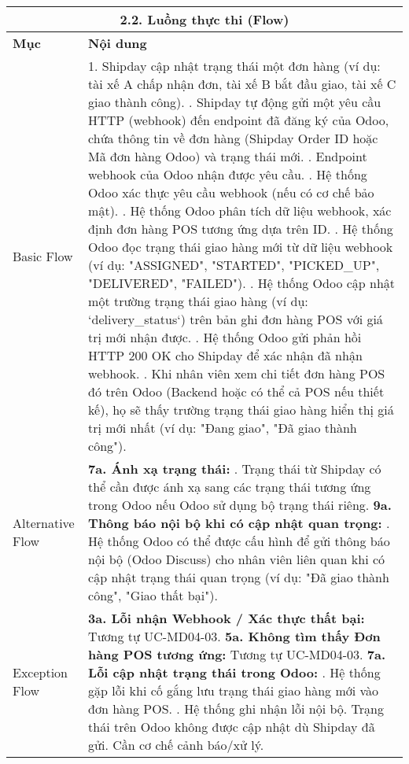 \begin{longtable}{|m{4cm}|p{11cm}|}
\hline
\multicolumn{2}{|c|}{\textbf{2.2. Luồng thực thi (Flow)}} \\
\hline
\textbf{Mục} & \textbf{Nội dung} \\
\hline
Basic Flow & 1. Shipday cập nhật trạng thái một đơn hàng (ví dụ: tài xế A chấp nhận đơn, tài xế B bắt đầu giao, tài xế C giao thành công). \newline 2. Shipday tự động gửi một yêu cầu HTTP (webhook) đến endpoint đã đăng ký của Odoo, chứa thông tin về đơn hàng (Shipday Order ID hoặc Mã đơn hàng Odoo) và trạng thái mới. \newline 3. Endpoint webhook của Odoo nhận được yêu cầu. \newline 4. Hệ thống Odoo xác thực yêu cầu webhook (nếu có cơ chế bảo mật). \newline 5. Hệ thống Odoo phân tích dữ liệu webhook, xác định đơn hàng POS tương ứng dựa trên ID. \newline 6. Hệ thống Odoo đọc trạng thái giao hàng mới từ dữ liệu webhook (ví dụ: "ASSIGNED", "STARTED", "PICKED\_UP", "DELIVERED", "FAILED"). \newline 7. Hệ thống Odoo cập nhật một trường trạng thái giao hàng (ví dụ: `delivery\_status`) trên bản ghi đơn hàng POS với giá trị mới nhận được. \newline 8. Hệ thống Odoo gửi phản hồi HTTP 200 OK cho Shipday để xác nhận đã nhận webhook. \newline 9. Khi nhân viên xem chi tiết đơn hàng POS đó trên Odoo (Backend hoặc có thể cả POS nếu thiết kế), họ sẽ thấy trường trạng thái giao hàng hiển thị giá trị mới nhất (ví dụ: "Đang giao", "Đã giao thành công"). \\
\hline
Alternative Flow & \textbf{7a. Ánh xạ trạng thái:} \newline    1. Trạng thái từ Shipday có thể cần được ánh xạ sang các trạng thái tương ứng trong Odoo nếu Odoo sử dụng bộ trạng thái riêng. \newline \textbf{9a. Thông báo nội bộ khi có cập nhật quan trọng:} \newline    1. Hệ thống Odoo có thể được cấu hình để gửi thông báo nội bộ (Odoo Discuss) cho nhân viên liên quan khi có cập nhật trạng thái quan trọng (ví dụ: "Đã giao thành công", "Giao thất bại"). \\
\hline
Exception Flow & \textbf{3a. Lỗi nhận Webhook / Xác thực thất bại:} Tương tự UC-MD04-03. \newline \textbf{5a. Không tìm thấy Đơn hàng POS tương ứng:} Tương tự UC-MD04-03. \newline \textbf{7a. Lỗi cập nhật trạng thái trong Odoo:} \newline    1. Hệ thống gặp lỗi khi cố gắng lưu trạng thái giao hàng mới vào đơn hàng POS. \newline    2. Hệ thống ghi nhận lỗi nội bộ. Trạng thái trên Odoo không được cập nhật dù Shipday đã gửi. Cần cơ chế cảnh báo/xử lý. \\

\end{longtable}
